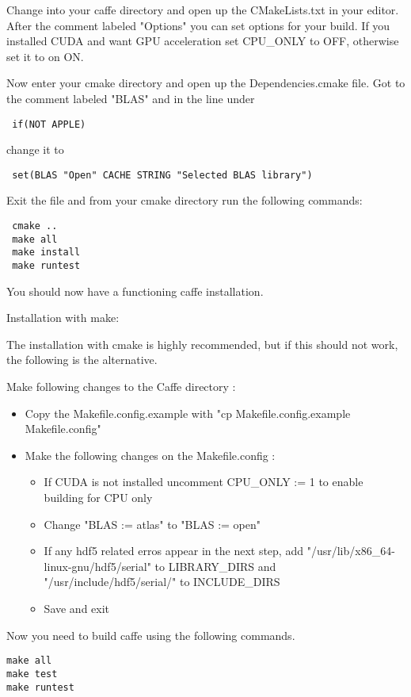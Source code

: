 \documentclass[main.tex]{subfiles}
\begin{document}
 Change into your caffe directory and open up the CMakeLists.txt in your editor. After the comment labeled "Options" you can set options for your build. If you installed CUDA and want GPU acceleration set CPU\_ONLY to OFF, otherwise set it to on ON.
 
 Now enter your cmake directory and open up the Dependencies.cmake file. Got to the comment labeled "BLAS" and in the line under 
 
 \begin{lstlisting}
 if(NOT APPLE)
 \end{lstlisting}
 
 change it to 
 
 \begin{lstlisting}
 set(BLAS "Open" CACHE STRING "Selected BLAS library")
 \end{lstlisting}
 
 Exit the file and from your cmake directory run the following commands:
 \begin{lstlisting}
 cmake ..
 make all
 make install
 make runtest
 \end{lstlisting}
 You should now have a functioning caffe installation.

\newpage
 
 
 
 
Installation with make:

The installation with cmake is highly recommended, but if this should not work, the following is the alternative.

 Make following changes to the Caffe directory : 
 \begin{itemize}
 \item Copy the Makefile.config.example with "cp Makefile.config.example Makefile.config"
 \item Make the following changes on the Makefile.config :
 	\begin{itemize}
 	\item If CUDA is not installed uncomment CPU\_ONLY := 1 to enable building for CPU only
 	\item Change "BLAS := atlas" to "BLAS := open"
 	\item If any hdf5 related erros appear in the next step, add "/usr/lib/x86\_64-linux-gnu/hdf5/serial" to LIBRARY\_DIRS and "/usr/include/hdf5/serial/" to INCLUDE\_DIRS
 	\item Save and exit
 	\end{itemize}
 	
 \end{itemize}
Now you need to build caffe using the following commands.
\begin{lstlisting}
make all
make test
make runtest  
\end{lstlisting}

 
\end{document}
